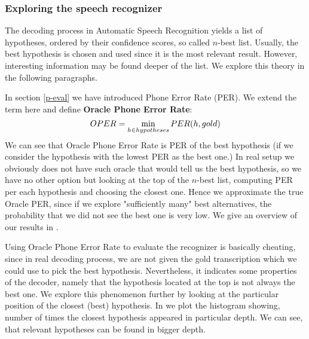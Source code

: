 \subsubsection{Exploring the speech recognizer}
\label{nbest-detail}
The decoding process in Automatic Speech Recognition yields a list of hypotheses, ordered by their confidence scores, so called $n$-best list.
Usually, the best hypothesis is chosen and used since it is the most relevant result.
However, interesting information may be found deeper of the list.
We explore this theory in the following paragraphs.
\par
In section \ref{p-eval} we have introduced Phone Error Rate (PER).
We extend the term here and define \textbf{Oracle Phone Error Rate}:
\begin{equation}
OPER = \operatorname*{min}_{h \in hypotheses} PER(h, gold)
\end{equation}
We can see that Oracle Phone Error Rate is PER of the best hypothesis (if we consider the hypothesis with the lowest PER as the best one.)
In real setup we obviously does not have such oracle that would tell us the best hypothesis, so we have no other option but looking at the top of the $n$-best list, computing PER per each hypothesis and choosing the closest one.
Hence we approximate the true Oracle PER, since if we explore "sufficiently many" best alternatives, the probability that we did not see the best one is very low.
We give an overview of our results in .
\par
Using Oracle Phone Error Rate to evaluate the recognizer is basically cheating, since in real decoding process, we are not given the gold transcription which we could use to pick the best hypothesis.
Nevertheless, it indicates some properties of the decoder, namely that the hypothesis located at the top is not always the best one.
We explore this phenomenon further by looking at the particular position of the closest (best) hypothesis.
In  we plot the histogram showing, number of times the closest hypothesis appeared in particular depth.
We can see, that relevant hypotheses can be found in bigger depth.
